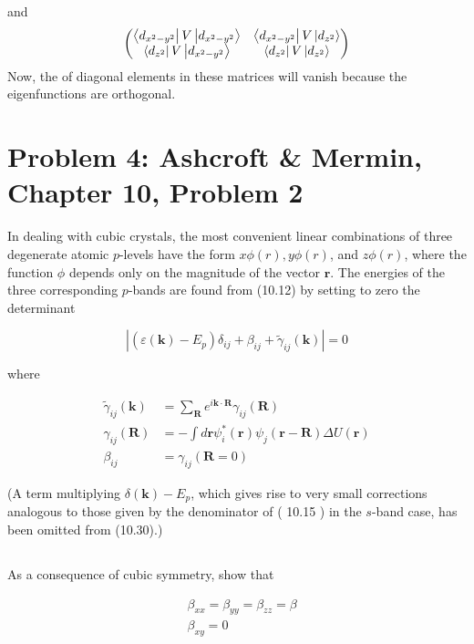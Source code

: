 \documentclass{article}
\begin{document}
and
\begin{equation}
    \begin{pmatrix}
    \bra{d_{x^2-y^2}}V\ket{d_{x^2-y^2}} & \bra{d_{x^2-y^2}}V\ket{d_{z^2}}\\
    \bra{d_{z^2}}V\ket{d_{x^2-y^2}} & \bra{d_{z^2}}V\ket{d_{z^2}}
    \end{pmatrix}
\end{equation}
Now, the of diagonal elements in these matrices will vanish because the eigenfunctions are orthogonal.

\section*{Problem 4: Ashcroft \& Mermin, Chapter 10, Problem 2}

In dealing with cubic crystals, the most convenient linear combinations of three degenerate atomic $p$-levels have the form $x \phi(r), y \phi(r)$, and $z \phi(r)$, where the function $\phi$ depends only on the magnitude of the vector $\mathbf{r}$. The energies of the three corresponding $p$-bands are found from (10.12) by setting to zero the determinant


\begin{equation*}
\left|\left(\varepsilon(\mathbf{k})-E_{p}\right) \delta_{i j}+\beta_{i j}+\tilde{\gamma}_{i j}(\mathbf{k})\right|=0 \tag{10.30}
\end{equation*}


where


\begin{align*}
\tilde{\gamma}_{i j}(\mathbf{k}) & =\sum_{\mathbf{R}} e^{i \mathbf{k} \cdot \mathbf{R}} \gamma_{i j}(\mathbf{R}) \\
\gamma_{i j}(\mathbf{R}) & =-\int d \mathbf{r} \psi_{i}^{*}(\mathbf{r}) \psi_{j}(\mathbf{r}-\mathbf{R}) \Delta U(\mathbf{r}) \\
\beta_{i j} & =\gamma_{i j}(\mathbf{R}=0) \tag{10.31}
\end{align*}


(A term multiplying $\delta(\mathbf{k})-E_{p}$, which gives rise to very small corrections analogous to those given by the denominator of ( 10.15 ) in the $s$-band case, has been omitted from (10.30).)\\
\subsection{}
As a consequence of cubic symmetry, show that

\begin{align*}
& \beta_{x x}=\beta_{y y}=\beta_{z z}=\beta \\
& \beta_{x y}=0 \tag{10.32}
\end{align*}
\end{document}
